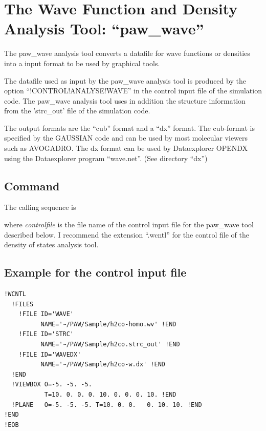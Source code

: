 \documentclass[final,12pt,makeidx,DIV=calc]{article}
\begin{document}
{{{{{{%
\newpage
\section{The Wave Function and Density Analysis Tool: ``paw\_wave''}
The paw\_wave analysis tool converts a datafile for wave functions or
densities into a input format to be used by graphical tools. 

The datafile used as input by the paw\_wave analysis tool is produced
by the option ``!CONTROL!ANALYSE!WAVE'' in the control input file of
the simulation code. The paw\_wave analysis tool uses in addition 
the structure information from  the 'strc\_out' file of the simulation code.

The output formats are the ``cub'' format and a ``dx'' format.  The
cub-format is specified by the GAUSSIAN code and can be used by most
molecular viewers such as AVOGADRO. The dx format can be used by
Dataexplorer OPENDX \cite{opendx} using the Dataexplorer program
``wave.net''. (See directory ``dx'')

\subsection{Command}

The calling sequence is

\bigskip{}\bigskip

\noindent 
where {\it controlfile} is the file name of the control input file for
the paw\_wave tool described below. I recommend the extension
``.wcntl'' for the control file of the density of states analysis tool.

\subsection{Example for the control input file}

\begin{verbatim}
!WCNTL
  !FILES
    !FILE ID='WAVE' 
          NAME='~/PAW/Sample/h2co-homo.wv' !END
    !FILE ID='STRC' 
          NAME='~/PAW/Sample/h2co.strc_out' !END
    !FILE ID='WAVEDX' 
          NAME='~/PAW/Sample/h2co-w.dx' !END
  !END
  !VIEWBOX O=-5. -5. -5. 
           T=10. 0. 0. 0. 10. 0. 0. 0. 10. !END
  !PLANE   O=-5. -5. -5. T=10. 0. 0.   0. 10. 10. !END
!END
!EOB
\end{verbatim}

}}}}}}
\end{document}
